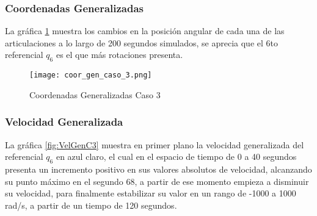     \begin{table}[H]%
        \centering
        \begin{center}
        \caption{Parámetros modificados del simulador (Sistema Conservativo)} 
        \centering
        \bigskip
        \end{center}
        \label{ref:TablaC3}
    \end{table}

    \subsubsection{Coordenadas Generalizadas}

    La gráfica \ref{fig:CoordGenC3} muestra los cambios en la posición 
    angular de cada una de las articulaciones a lo largo de 200 segundos 
    simulados, se aprecia que el 6to referencial $q_6$ es el que más rotaciones 
    presenta.

    \begin{figure} [H]%
            \centering
            \texttt{[image: coor\_gen\_caso\_3.png]} 
        \caption{Coordenadas Generalizadas Caso 3}
        \label{fig:CoordGenC3}
    \end{figure}

    \subsubsection{Velocidad Generalizada}

    La gráfica \ref{fig:VelGenC3} muestra en primer plano la velocidad 
    generalizada del referencial $q_6$ en azul claro, el cual en el espacio 
    de tiempo de 0 a 40 segundos presenta un incremento positivo en sus valores 
    absolutos de velocidad, alcanzando su punto máximo en el segundo 68, 
    a partir de ese momento empieza a disminuir su velocidad, para 
    finalmente estabilizar su valor en un rango de -1000 a 1000 
    rad/s, a partir de un tiempo de 120 segundos. 

